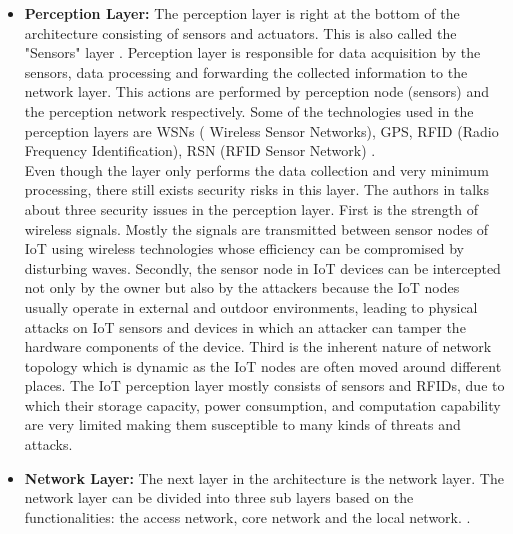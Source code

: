 \documentclass[letterpaper, 10 pt, conference]{ieeeconf}  %
\begin{document}
\begin{itemize}
\item \textbf{Perception Layer:} The perception layer is right at the bottom of the architecture consisting of sensors and actuators. This is also called the "Sensors" layer \cite{c4}. Perception layer is responsible for data acquisition by the sensors, data processing and forwarding the collected information to the network layer. This actions are performed by perception node (sensors) and the perception network \cite{c6} respectively. Some of the technologies used in the perception layers are WSNs ( Wireless Sensor Networks), GPS, RFID (Radio Frequency Identification), RSN (RFID Sensor Network) \cite{c4}\cite{c5}\cite{c6}.\\

Even though the layer only performs the data collection and very minimum processing, there still exists security risks in this layer. The authors in \cite{c4} talks about three security issues in the perception layer. First is the strength of wireless signals. Mostly the signals are transmitted between sensor nodes of IoT using wireless technologies whose efficiency can be compromised by disturbing waves. Secondly, the sensor node in IoT devices can be intercepted not only by the owner but also by the attackers because the IoT nodes usually operate in external and outdoor environments, leading to physical attacks on IoT sensors and devices in which an attacker can tamper the hardware components of the device. Third is the inherent nature of network topology which is dynamic as the IoT nodes are often moved around different places. The IoT perception layer mostly consists of sensors and RFIDs, due to which their storage capacity, power consumption, and computation capability are very limited making them susceptible to many kinds of threats and attacks.\\

\item \textbf{Network Layer:} The next layer in the architecture is the network layer. The network layer can be divided into three sub layers based on the functionalities: the access network, core network and the local network. \cite{c6}.


\end{itemize}
\end{document}
